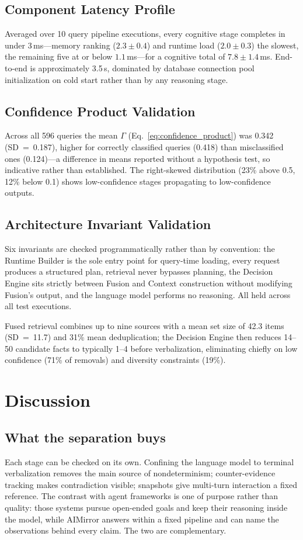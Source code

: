 \documentclass[conference]{IEEEtran}
\begin{document}
\subsection{Component Latency Profile}
Averaged over 10 query pipeline executions, every cognitive stage completes in under 3\,ms---memory ranking ($2.3 \pm 0.4$) and runtime load ($2.0 \pm 0.3$) the slowest, the remaining five at or below $1.1$\,ms---for a cognitive total of $7.8 \pm 1.4$\,ms. End-to-end is approximately 3.5\,s, dominated by database connection pool initialization on cold start rather than by any reasoning stage.

\subsection{Confidence Product Validation}
Across all 596 queries the mean $\Gamma$ (Eq.~\eqref{eq:confidence_product}) was 0.342 (SD~=~0.187), higher for correctly classified queries (0.418) than misclassified ones (0.124)---a difference in means reported without a hypothesis test, so indicative rather than established. The right-skewed distribution (23\% above 0.5, 12\% below 0.1) shows low-confidence stages propagating to low-confidence outputs.

\subsection{Architecture Invariant Validation}
Six invariants are checked programmatically rather than by convention: the Runtime Builder is the sole entry point for query-time loading, every request produces a structured plan, retrieval never bypasses planning, the Decision Engine sits strictly between Fusion and Context construction without modifying Fusion's output, and the language model performs no reasoning. All held across all test executions.

Fused retrieval combines up to nine sources with a mean set size of 42.3 items (SD~=~11.7) and 31\% mean deduplication; the Decision Engine then reduces 14--50 candidate facts to typically 1--4 before verbalization, eliminating chiefly on low confidence (71\% of removals) and diversity constraints (19\%).

\section{Discussion}
\label{sec:discussion}

\subsection{What the separation buys}
Each stage can be checked on its own. Confining the language model to terminal verbalization removes the main source of nondeterminism; counter-evidence tracking makes contradiction visible; snapshots give multi-turn interaction a fixed reference. The contrast with agent frameworks \cite{yao2023, autogpt2023} is one of purpose rather than quality: those systems pursue open-ended goals and keep their reasoning inside the model, while AIMirror answers within a fixed pipeline and can name the observations behind every claim. The two are complementary.
\end{document}
